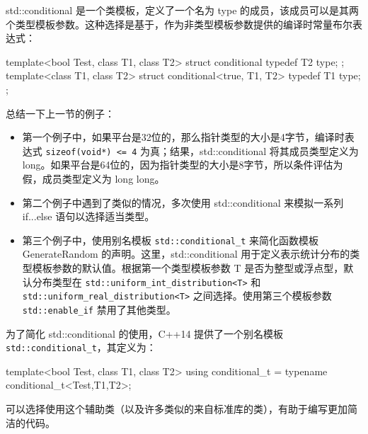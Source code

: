 
std::conditional 是一个类模板，定义了一个名为 type 的成员，该成员可以是其两个类型模板参数。这种选择是基于，作为非类型模板参数提供的编译时常量布尔表达式：

\begin{cpp}
template<bool Test, class T1, class T2>
struct conditional
{
    typedef T2 type;
};
template<class T1, class T2>
struct conditional<true, T1, T2>
{
    typedef T1 type;
};
\end{cpp}

总结一下上一节的例子：

\begin{itemize}
\item
第一个例子中，如果平台是32位的，那么指针类型的大小是4字节，编译时表达式 \verb|sizeof(void*) <= 4| 为真；结果，std::conditional 将其成员类型定义为 long。如果平台是64位的，因为指针类型的大小是8字节，所以条件评估为假，成员类型定义为 long long。

\item
第二个例子中遇到了类似的情况，多次使用 std::conditional 来模拟一系列 if...else 语句以选择适当类型。

\item
第三个例子中，使用别名模板 \verb|std::conditional_t| 来简化函数模板 GenerateRandom 的声明。这里，std::conditional 用于定义表示统计分布的类型模板参数的默认值。根据第一个类型模板参数 T 是否为整型或浮点型，默认分布类型在 \verb|std::uniform_int_distribution<T>| 和 \verb|std::uniform_real_distribution<T>| 之间选择。使用第三个模板参数 \verb|std::enable_if| 禁用了其他类型。
\end{itemize}

为了简化 std::conditional 的使用，C++14 提供了一个别名模板 \verb|std::conditional_t|，其定义为：

\begin{cpp}
template<bool Test, class T1, class T2>
using conditional_t = typename conditional_t<Test,T1,T2>;
\end{cpp}

可以选择使用这个辅助类（以及许多类似的来自标准库的类），有助于编写更加简洁的代码。

